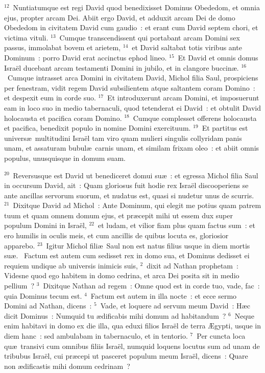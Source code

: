 ${}^{12}$~Nuntiatumque est regi David quod benedixisset Dominus Obededom, et omnia ejus, propter arcam Dei. Abiit ergo David, et adduxit arcam Dei de domo Obededom in civitatem David cum gaudio~: et erant cum David septem chori, et victima vituli.
${}^{13}$~Cumque transcendissent qui portabant arcam Domini sex passus, immolabat bovem et arietem,
${}^{14}$~et David saltabat totis viribus ante Dominum~: porro David erat accinctus ephod lineo.
${}^{15}$~Et David et omnis domus Isra\"el ducebant arcam testamenti Domini in jubilo, et in clangore buccin\ae .
${}^{16}$~Cumque intrasset arca Domini in civitatem David, Michol filia Saul, prospiciens per fenestram, vidit regem David subsilientem atque saltantem coram Domino~: et despexit eum in corde suo.
${}^{17}$~Et introduxerunt arcam Domini, et imposuerunt eam in loco suo in medio tabernaculi, quod tetenderat ei David~: et obtulit David holocausta et pacifica coram Domino.
${}^{18}$~Cumque complesset offerens holocausta et pacifica, benedixit populo in nomine Domini exercituum.
${}^{19}$~Et partitus est univers\ae\ multitudini Isra\"el tam viro quam mulieri singulis collyridam panis unam, et assaturam bubul\ae\ carnis unam, et similam frixam oleo~: et abiit omnis populus, unusquisque in domum suam.


${}^{20}$~Reversusque est David ut benediceret domui su\ae~: et egressa Michol filia Saul in occursum David, ait~: Quam gloriosus fuit hodie rex Isra\"el discooperiens se ante ancillas servorum suorum, et nudatus est, quasi si nudetur unus de scurris.
${}^{21}$~Dixitque David ad Michol~: Ante Dominum, qui elegit me potius quam patrem tuum et quam omnem domum ejus, et pr\ae cepit mihi ut essem dux super populum Domini in Isra\"el,
${}^{22}$~et ludam, et vilior fiam plus quam factus sum~: et ero humilis in oculis meis, et cum ancillis de quibus locuta es, gloriosior apparebo.
${}^{23}$~Igitur Michol fili\ae\ Saul non est natus filius usque in diem mortis su\ae .
~Factum est autem cum sedisset rex in domo sua, et Dominus dedisset ei requiem undique ab universis inimicis suis,
${}^{2}$~dixit ad Nathan prophetam~: Videsne quod ego habitem in domo cedrina, et arca Dei posita sit in medio pellium~?
${}^{3}$~Dixitque Nathan ad regem~: Omne quod est in corde tuo, vade, fac~: quia Dominus tecum est.
${}^{4}$~Factum est autem in illa nocte~: et ecce sermo Domini ad Nathan, dicens~:
${}^{5}$~Vade, et loquere ad servum meum David~: H\ae c dicit Dominus~: Numquid tu \ae dificabis mihi domum ad habitandum~?
${}^{6}$~Neque enim habitavi in domo ex die illa, qua eduxi filios Isra\"el de terra \AE gypti, usque in diem hanc~: sed ambulabam in tabernaculo, et in tentorio.
${}^{7}$~Per cuncta loca qu\ae\ transivi cum omnibus filiis Isra\"el, numquid loquens locutus sum ad unam de tribubus Isra\"el, cui pr\ae cepi ut pasceret populum meum Isra\"el, dicens~: Quare non \ae dificastis mihi domum cedrinam~?


